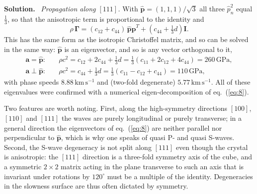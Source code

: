\documentclass[a4paper,12pt]{paper}
\newenvironment{solution}{\par\noindent\textbf{Solution.}\ }{\par\medskip}
\begin{document}
\begin{solution}
\emph{Propagation along $[111]$.} With $\hat{\mathbf{p}}=(1,1,1)/\sqrt{3}$ all three
$\hat{p}_{n}^{2}$ equal $\tfrac{1}{3}$, so that the anisotropic term is proportional to the
identity and
\begin{equation}
\rho\,\bm{\Gamma}=(c_{12}+c_{44})\,\hat{\mathbf{p}}\hat{\mathbf{p}}^{T}+\left(c_{44}+\tfrac{1}{3}d\right)\mathbf{I}.
\label{eq:12}
\end{equation}
This has the same form as the isotropic Christoffel matrix, and so can be solved in the same
way: $\hat{\mathbf{p}}$ is an eigenvector, and so is any vector orthogonal to it,
\begin{equation}
\begin{split}
\mathbf{a}=\hat{\mathbf{p}}:&\quad \rho c^{2}=c_{12}+2c_{44}+\tfrac{1}{3}d=\tfrac{1}{3}(c_{11}+2c_{12}+4c_{44})=260\,\mathrm{GPa},\\
\mathbf{a}\perp\hat{\mathbf{p}}:&\quad \rho c^{2}=c_{44}+\tfrac{1}{3}d=\tfrac{1}{3}(c_{11}-c_{12}+c_{44})=110\,\mathrm{GPa},
\end{split}
\label{eq:13}
\end{equation}
with phase speeds $8.88\,\mathrm{km\,s^{-1}}$ and (two-fold degenerate)
$5.77\,\mathrm{km\,s^{-1}}$. All of these eigenvalues were confirmed with a numerical
eigen-decomposition of eq.~(\ref{eq:8}).

Two features are worth noting. First, along the high-symmetry directions $[100]$, $[110]$ and
$[111]$ the waves are purely longitudinal or purely transverse; in a general direction the
eigenvectors of eq.~(\ref{eq:8}) are neither parallel nor perpendicular to $\hat{\mathbf{p}}$,
which is why one speaks of quasi P- and quasi S-waves. Second, the S-wave degeneracy is not
split along $[111]$ even though the crystal is anisotropic: the $[111]$ direction is a three-fold
symmetry axis of the cube, and a symmetric $2\times2$ matrix acting in the plane transverse to
such an axis that is invariant under rotations by $120^{\circ}$ must be a multiple of the
identity. Degeneracies in the slowness surface are thus often dictated by symmetry.
\end{solution}
\end{document}
